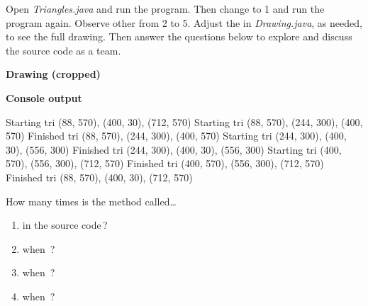 
Open \textit{Triangles.java} and run the program.
Then change  to 1 and run the program again.
Observe other  from 2 to 5.
Adjust the  in \textit{Drawing.java}, as needed, to see the full drawing.
Then answer the questions below to explore and discuss the source code as a team.

\vspace{1em}
\begin{minipage}[t]{0.41\linewidth}

\begin{center}
\textbf{Drawing (cropped)}
\end{center}


\end{minipage}
\hfill
\begin{minipage}[t]{0.55\linewidth}

\begin{center}
\textbf{Console output}
\end{center}

\footnotesize
\begin{javalst}
Starting tri (88, 570), (400, 30), (712, 570)
    Starting tri (88, 570), (244, 300), (400, 570)
    Finished tri (88, 570), (244, 300), (400, 570)
    Starting tri (244, 300), (400, 30), (556, 300)
    Finished tri (244, 300), (400, 30), (556, 300)
    Starting tri (400, 570), (556, 300), (712, 570)
    Finished tri (400, 570), (556, 300), (712, 570)
Finished tri (88, 570), (400, 30), (712, 570)
\end{javalst}
\end{minipage}




\Q How many times is the  method called\ldots

\begin{multicols}{2}
\begin{enumerate}
\item in the source code\,? 
\item when \,? 
\item when \,? 
\item when \,? 
\end{enumerate}
\end{multicols}


